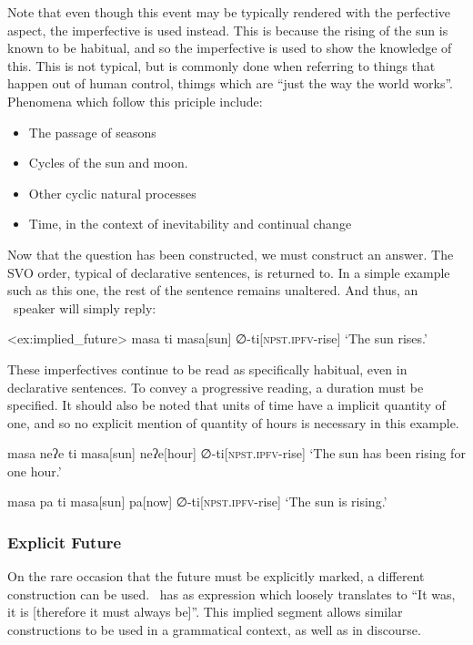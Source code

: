 Note that even though this event may be typically rendered with the perfective aspect, the imperfective is used instead. This is because the rising of the sun is known to be habitual, and so the imperfective is used to show the knowledge of this. This is not typical, but is commonly done when referring to things that happen out of human control, thimgs which are ``just the way the world works''. Phenomena which follow this priciple include:

\begin{itemize}
  \item The passage of seasons
  \item Cycles of the sun and moon.
  \item Other cyclic natural processes
  \item Time, in the context of inevitability and continual change
\end{itemize}

Now that the question has been constructed, we must construct an answer. The SVO order, typical of declarative sentences, is returned to. In a simple example such as this one, the rest of the sentence remains unaltered. And thus, an \langname\ speaker will simply reply:

\ex<ex:implied_future>
\begingl
\glpreamble masa ti
\endpreamble
masa[sun] ∅-ti[\textsc{npst.ipfv-}rise]
\glft `The sun rises.'
\endgl
\xe

These imperfectives continue to be read as specifically habitual, even in declarative sentences. To convey a progressive reading, a duration must be specified.
It should also be noted that units of time have a implicit quantity of one, and so no explicit mention of quantity of hours is necessary in this example.

\ex
\begingl
\glpreamble masa neʔe ti
\endpreamble
masa[sun]
neʔe[hour]
∅-ti[\textsc{npst.ipfv-}rise]
\glft `The sun has been rising for one hour.'
\endgl
\xe

\ex
\begingl
\glpreamble masa pa ti
\endpreamble
masa[sun]
pa[now]
∅-ti[\textsc{npst.ipfv-}rise]
\glft `The sun is rising.'
\endgl
\xe

\subsubsection{Explicit Future}
On the rare occasion that the future must be explicitly marked, a different construction can be used. \langname\ has as expression which loosely translates to ``It was, it is [therefore it must always be]''. This implied segment allows similar constructions to be used in a grammatical context, as well as in discourse.

